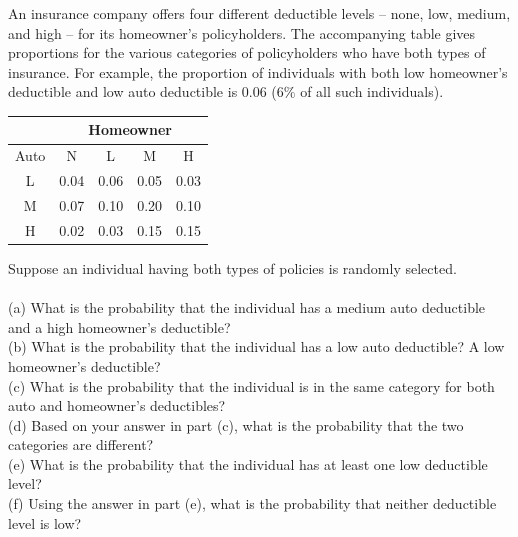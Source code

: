 \documentclass[12pt,letterpaper]{hmcpset}
\begin{document}
\begin{solution}

\end{solution}
\newpage
\begin{problem}[2.2.21]
An insurance company offers four different deductible levels -- none, low, medium, and high -- for its homeowner’s policyholders. The accompanying table gives proportions for the various categories of policyholders who have both types of insurance. For example, the proportion of individuals with both low homeowner’s deductible and low auto deductible is 0.06 (6$\%$ of all such individuals).\\
\begin{center}
	\begin{tabular}{|c||c|c|c|c|}
		\hline
		  & \multicolumn{4}{c|}{Homeowner}\\
 		\hline
 		\hline
 		Auto & N & L & M & H \\
 		\hline
 		L & 0.04 & 0.06 & 0.05 & 0.03 \\
 		M & 0.07 & 0.10 & 0.20 & 0.10\\
 		H & 0.02 & 0.03 & 0.15 & 0.15\\
 		 \hline
	 \end{tabular}

\end{center}
Suppose an individual having both types of policies is randomly selected.
\\ \\
(a) What is the probability that the individual has a medium auto deductible and a high homeowner’s deductible?
\\
(b) What is the probability that the individual has a low auto deductible? A low homeowner’s deductible?
\\
(c) What is the probability that the individual is in the same category for both auto and homeowner’s deductibles?
\\
(d) Based on your answer in part (c), what is the probability that the two categories are different?
\\
(e) What is the probability that the individual has at least one low deductible level?
\\
(f) Using the answer in part (e), what is the probability that neither deductible level is low?



\end{problem}

\begin{solution}

\end{solution}
\newpage
\end{document}
